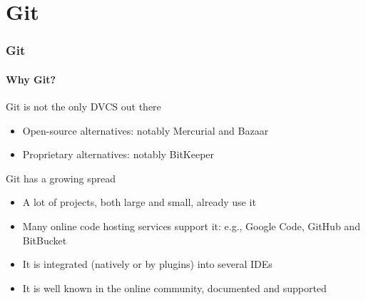 \section{Git}

\begin{frame}
\frametitle{Git}
\framesubtitle{Why Git?}

\begin{block}{Git is not the only DVCS out there}
\begin{itemize}
\item Open-source alternatives: notably Mercurial and Bazaar
\item Proprietary alternatives: notably BitKeeper
\end{itemize}
\end{block}
\pause
\begin{block}{Git has a growing spread}
\begin{itemize}
\item A lot of projects, both large and small, already use it
\item Many online code hosting services support it: e.g., Google Code, GitHub and BitBucket
\item It is integrated (natively or by plugins) into several IDEs
\item It is well known in the online community, documented and supported
\end{itemize}
\end{block}

\end{frame}